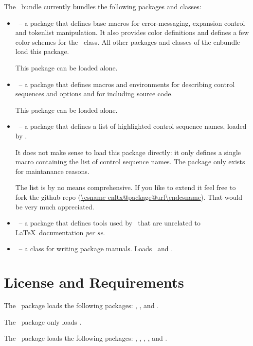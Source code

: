 \documentclass[load-preamble]{cnltx-doc}
\newcommand*\latin[1]{\textit{#1}}
\begin{document}
The \cnltx\ bundle currently bundles the following packages and classes:
\begin{itemize}
  \item \cnltxbase\ -- a package that defines base macros for error-messaging,
    expansion control and tokenlist manipulation.  It also provides color
    definitions and defines a few color schemes for the \cnltxdoc\ class.  All
    other packages and classes of the cnbundle load this package.\par
    This package can be loaded alone.
  \item \cnltxexample\ -- a package that defines macros and environments for
    describing control sequences and options and for including source code.\par
    This package can be loaded alone.
  \item \cnltxcsnames\ -- a package that defines a list of highlighted control
    sequence names, loaded by \cnltxexample.\par
    It does not make sense to load this package directly: it only defines a
    single macro containing the list of control sequence names.  The package
    only exists for maintanance reasons.\par
    The list is by no means comprehensive.  If you like to extend it feel free
    to fork the github repo (\url{\csname cnltx@package@url\endcsname}).
    That would be very much appreciated.
  \item \cnltxtools\ -- a package that defines tools used by \cnltxdoc\ that
    are unrelated to \LaTeX\ documentation \latin{per se}.
  \item \cnltxdoc\ -- a class for writing package manuals.  Loads
    \cnltxexample\ and \cnltxtools.
\end{itemize}

\section{License and Requirements}\label{sec:license}
\license

The \cnltxbase\ package loads the following packages: ,
,  and .

The \cnltxcsnames\ package only loads \cnltxbase.

The \cnltxexample\ package loads the following packages:
\cnltxbase, \cnltxtools, , ,
 and .
\end{document}
